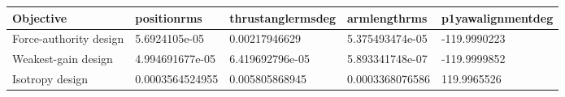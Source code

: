 \begin{tabular}{@{}lllll@{}}
\toprule
Objective & positionrms & thrustanglermsdeg & armlengthrms & p1yawalignmentdeg \\
\midrule
Force-authority design & 5.6924105e-05 & 0.00217946629 & 5.375493474e-05 & -119.9990223 \\
Weakest-gain design & 4.994691677e-05 & 6.419692796e-05 & 5.893341748e-07 & -119.9999852 \\
Isotropy design & 0.0003564524955 & 0.005805868945 & 0.0003368076586 & 119.9965526 \\
\bottomrule
\end{tabular}
